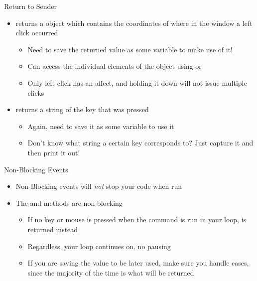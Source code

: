 \documentclass[pdf, aspectratio=169, 12pt]{beamer}
\begin{document}
\begin{frame}{Return to Sender}
	\begin{itemize}
		\item {} returns a  object which contains the coordinates of where in the window a left click occurred
			\begin{itemize}
				\item Need to save the returned value as some variable to make use of it!
				\item Can access the individual elements of the  object using  or 
				\item Only left click has an affect, and holding it down will not issue multiple clicks
			\end{itemize}
		\item {} returns a string of the key that was pressed
			\begin{itemize}
				\item Again, need to save it as some variable to use it
				\item Don't know what string a certain key corresponds to? Just capture it and then print it out!
			\end{itemize}
	\end{itemize}
\end{frame}

\begin{frame}{Non-Blocking Events}
	\begin{itemize}
		\item \alert{Non-Blocking events} will \emph{not} stop your code when run
		\item The  and  methods are non-blocking
			\begin{itemize}
				\item If no key or mouse is pressed when the command is run in your loop,  is returned instead
				\item Regardless, your loop continues on, no pausing
				\item If you are saving the value to be later used, make sure you handle  cases, since the majority of the time  is what will be returned
			\end{itemize}
	\end{itemize}
\end{frame}
\end{document}
